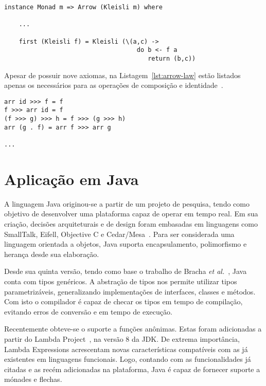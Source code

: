 \documentclass[10pt, conference]{IEEEtran}
\begin{document}
\begin{lstlisting}[caption={Instância para $Monad$~\cite{hughes2005programming}}, label={lst:kleisli-arrow}]
instance Monad m => Arrow (Kleisli m) where

	...
	
	first (Kleisli f) = Kleisli (\(a,c) -> 
									do b <- f a
									   return (b,c))
\end{lstlisting}

Apesar de possuir nove axiomas, na Listagem~\ref{lst:arrow-law} estão listados apenas os necessários para as operações de composição e identidade~\cite{lindley2011idioms}.

\begin{lstlisting}[caption={Leis para $Arrow$~\cite{lindley2011idioms}}, label={lst:arrow-law}]
arr id >>> f = f
f >>> arr id = f
(f >>> g) >>> h = f >>> (g >>> h)
arr (g . f) = arr f >>> arr g

...

\end{lstlisting}

\section{Aplicação em Java}
\label{sec:java-apply}
A linguagem Java originou-se a partir de um projeto de pesquisa, tendo como
objetivo de desenvolver uma plataforma capaz de operar em tempo real. Em sua criação, decisões arquiteturais e de design foram embasadas em linguagens como SmallTalk, Eifell, Objective C e Cedar/Mesa~\cite{gosling1995java}. Para ser considerada uma linguagem orientada a objetos, Java suporta encapsulamento, polimorfismo e herança desde sua elaboração.

Desde sua quinta versão, tendo como base o trabalho de Bracha \textit{et al.}~\cite{bracha2004generics, bracha1998making}, Java conta com tipos genéricos. A abstração de tipos nos permite utilizar tipos parametrizáveis, generalizando implementações de interfaces, classes e métodos. Com isto o compilador é capaz de checar os tipos em tempo de compilação, evitando erros de conversão e em tempo de execução.

Recentemente obteve-se o suporte a funções anônimas. Estas foram adicionadas a partir do Lambda Project~\cite{jsr335}, na versão 8 da JDK. De extrema importância, Lambda Expressions acrescentam  novas características compatíveis com as já existentes em linguagens funcionais. Logo, contando com as funcionalidades já citadas e as recém adicionadas na plataforma, Java é capaz de fornecer suporte a mónades e flechas.
\end{document}
